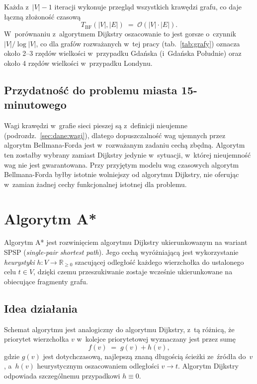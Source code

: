 Każda z~$|V|-1$ iteracji wykonuje przegląd wszystkich krawędzi grafu,
co daje łączną złożoność czasową
\[
T_{\mathrm{BF}}(|V|,|E|) \;=\; \mathcal{O}(|V|\cdot|E|).
\]
W~porównaniu z~algorytmem Dijkstry oszacowanie to jest gorsze o~czynnik
$|V|/\log|V|$, co dla grafów rozważanych w~tej pracy
(tab.~\ref{tab:grafy}) oznacza około 2--3 rzędów wielkości w~przypadku
Gdańska (i~Gdańska Południe) oraz około 4 rzędów wielkości
w~przypadku Londynu.

\subsection{Przydatność do problemu miasta 15-minutowego}

Wagi krawędzi w~grafie sieci pieszej są z~definicji nieujemne
(podrozdz.~\ref{sec:dane:wagi}), dlatego dopuszczalność wag ujemnych
przez algorytm Bellmana-Forda jest w~rozważanym zadaniu cechą zbędną.
Algorytm ten zostałby wybrany zamiast Dijkstry jedynie w~sytuacji,
w~której nieujemność wag nie jest gwarantowana. Przy
przyjętym modelu wag czasowych algorytm Bellmana-Forda byłby istotnie
wolniejszy od algorytmu Dijkstry, nie oferując w~zamian żadnej cechy
funkcjonalnej istotnej dla problemu.

\section{Algorytm A*}
\label{sec:sssp:astar}

Algorytm A* \cite{hart1968astar} jest rozwinięciem algorytmu Dijkstry
ukierunkowanym na wariant SPSP (\emph{single-pair shortest path}).
Jego cechą wyróżniającą jest wykorzystanie \emph{heurystyki}
$h:V\to\mathbb{R}_{\ge 0}$ szacującej odległość każdego wierzchołka do
ustalonego celu $t\in V$, dzięki czemu przeszukiwanie zostaje wcześnie
ukierunkowane na obiecujące fragmenty grafu.

\subsection{Idea działania}

Schemat algorytmu jest analogiczny do algorytmu Dijkstry, z~tą różnicą,
że priorytet wierzchołka $v$ w~kolejce priorytetowej wyznaczany jest
przez sumę
\[
f(v) \;=\; g(v) + h(v),
\]
gdzie $g(v)$ jest dotychczasową, najlepszą znaną długością ścieżki
ze~źródła do~$v$, a~$h(v)$ heurystycznym oszacowaniem odległości
$v\to t$. Algorytm Dijkstry odpowiada szczególnemu przypadkowi
$h\equiv 0$.


